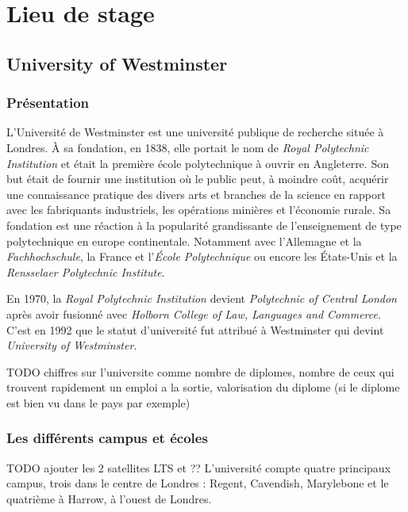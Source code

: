 \chapter{Lieu de stage}

\section{University of Westminster}

\subsection{Pr\'esentation}

L'Universit\'e de Westminster est une universit\'e publique de recherche situ\'ee \`a Londres. 
\`A sa fondation, en 1838, elle portait le nom de \textit{Royal Polytechnic Institution} et \'etait la premi\`ere \'ecole polytechnique \`a ouvrir en Angleterre.
Son but \'etait de fournir une institution o\`u le public peut, \`a moindre co\^ut, acqu\'erir une connaissance pratique des divers arts et branches de la science en rapport avec les fabriquants industriels, les op\'erations mini\`eres et l'\'economie rurale.
Sa fondation est une r\'eaction \`a la popularit\'e grandissante de l'enseignement de type polytechnique en europe continentale. 
Notamment avec l'Allemagne et la \textit{Fachhochschule}, la France et l'\textit{\'Ecole Polytechnique} ou encore les \'Etats-Unis et la \textit{Rensselaer Polytechnic Institute}.

En 1970, la \textit{Royal Polytechnic Institution} devient \textit{Polytechnic of Central London} apr\`es avoir fusionn\'e avec \textit{Holborn College of Law, Languages and Commerce}.
C'est en 1992 que le statut d'universit\'e fut attribu\'e \`a Westminster qui devint \textit{University of Westminster}.

 TODO chiffres sur l'universite comme nombre de diplomes, nombre de ceux qui trouvent rapidement un emploi a la sortie, valorisation du diplome (si le diplome est bien vu dans le pays par exemple)

\subsection{Les diff\'erents campus et \'ecoles}
\label{section:campus}
TODO ajouter les 2 satellites LTS et ??
L'universit\'e compte quatre principaux campus, trois dans le centre de Londres : Regent, Cavendish, Marylebone et le quatri\`eme \`a Harrow, \`a l'ouest de Londres.

